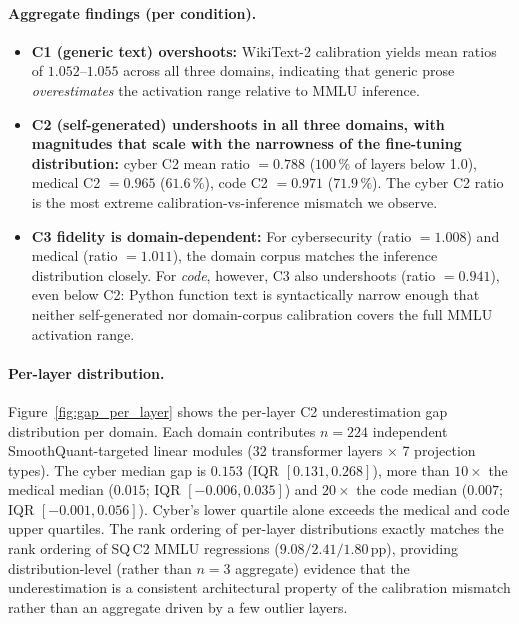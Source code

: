 \documentclass[11pt]{article}
\begin{document}
\paragraph{Aggregate findings (per condition).}
\begin{itemize}
\item \textbf{C1 (generic text) overshoots:}  WikiText-2 calibration
  yields mean ratios of $1.052$--$1.055$ across all three domains,
  indicating that generic prose \emph{overestimates} the activation
  range relative to MMLU inference.
\item \textbf{C2 (self-generated) undershoots in all three domains,
  with magnitudes that scale with the narrowness of the fine-tuning
  distribution:}  cyber C2 mean ratio $= 0.788$ ($100\,\%$ of layers
  below 1.0), medical C2 $= 0.965$ ($61.6\,\%$), code C2 $= 0.971$
  ($71.9\,\%$).  The cyber C2 ratio is the most extreme
  calibration-vs-inference mismatch we observe.
\item \textbf{C3 fidelity is domain-dependent:}  For cybersecurity
  (ratio $= 1.008$) and medical (ratio $= 1.011$), the domain
  corpus matches the inference distribution closely.  For \emph{code},
  however, C3 also undershoots (ratio $= 0.941$), even below C2:
  Python function text is syntactically narrow enough that neither
  self-generated nor domain-corpus calibration covers the full MMLU
  activation range.
\end{itemize}

\paragraph{Per-layer distribution.}
\begin{sloppypar}
Figure~\ref{fig:gap_per_layer} shows the per-layer C2
underestimation gap distribution per domain.  Each domain
contributes $n = 224$ independent SmoothQuant-targeted linear
modules (32 transformer layers $\times$ 7 projection types).  The
cyber median gap is $0.153$ (IQR $[0.131, 0.268]$), more than
$10\times$ the medical median ($0.015$; IQR $[-0.006, 0.035]$) and
$20\times$ the code median ($0.007$; IQR $[-0.001, 0.056]$).
Cyber's lower quartile alone exceeds the medical and code upper
quartiles.  The rank
ordering of per-layer distributions exactly matches the rank
ordering of SQ\,C2 MMLU regressions ($9.08 / 2.41 / 1.80$\,pp),
providing distribution-level (rather than $n=3$ aggregate) evidence
that the underestimation is a consistent architectural property of
the calibration mismatch rather than an aggregate driven by a few
outlier layers.
\end{sloppypar}
\end{document}

